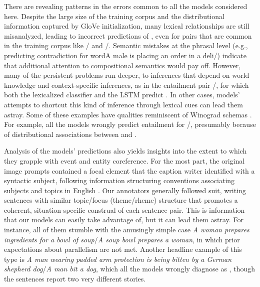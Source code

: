 There are revealing patterns in the errors common to all the models
considered here. Despite the large size of the training corpus and the
distributional information captured by GloVe initialization, many
lexical relationships are still misanalyzed, leading to incorrect
predictions of , even for pairs that are common in the
training corpus like / and
/. Semantic mistakes at the phrasal level
(e.g., predicting contradiction for word{A male is placing an order in a 
deli}/) indicate
that additional attention to compositional semantics would pay off.
%
However, many of the persistent problems run deeper, to inferences
that depend on world knowledge and context-specific inferences, as in
the entailment pair /, for which both
the lexicalized classifier and the LSTM predict . 
In other cases, models' attempts to shortcut this kind of inference 
through lexical cues can lead them astray. 
Some of these examples have qualities
reminiscent of Winograd schemas \cite{Winograd:1972,Levesque:2013}. For
example, all the models wrongly predict
entailment for /, presumably because of
distributional associations between  and .

Analysis of the models' predictions also yields insights into the
extent to which they grapple with event and entity coreference. For
the most part, the original image prompts contained a focal element
that the caption writer identified with a syntactic subject, following
information structuring conventions associating subjects and topics in
English \cite{Ward04}. Our annotators generally followed suit, writing
sentences with similar topic/focus (theme/rheme) structure that
promotes a coherent, situation-specific construal of each sentence
pair. This is information that our models can easily take advantage
of, but it can lead them astray. For instance, all of them stumble
with the amusingly simple case \emph{A woman prepares ingredients for
  a bowl of soup}/\emph{A soup bowl prepares a woman}, in which prior
expectations about parallelism are not met. Another headline example
of this type is \emph{A man wearing padded arm protection is being
  bitten by a German shepherd dog}/\emph{A man bit a dog}, which all
the models wrongly diagnose as , though the sentences
report two very different stories.

